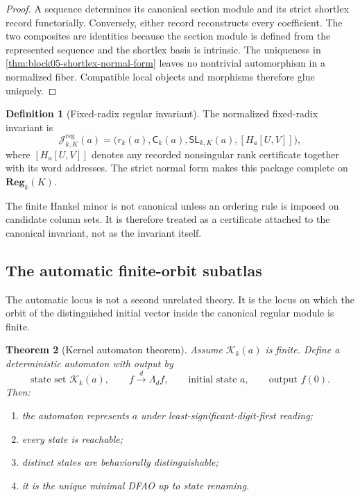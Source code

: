 \documentclass[11pt]{article}
\newtheorem{theorem}{Theorem}[section]
\theoremstyle{definition}
\newtheorem{definition}[theorem]{Definition}
\theoremstyle{remark}
\begin{document}
\begin{proof}
A sequence determines its canonical section module and its strict shortlex record functorially.  Conversely, either record reconstructs every coefficient.  The two composites are identities because the section module is defined from the represented sequence and the shortlex basis is intrinsic.  The uniqueness in \cref{thm:block05-shortlex-normal-form} leaves no nontrivial automorphism in a normalized fiber.  Compatible local objects and morphisms therefore glue uniquely.
\end{proof}

\begin{definition}[Fixed-radix regular invariant]
The normalized fixed-radix invariant is
\begin{equation}
\mathcal J_{k,K}^{\mathrm{reg}}(a)
=
\bigl(
 r_k(a),
 \mathsf C_k(a),
 \mathsf{SL}_{k,K}(a),
 [H_a[U,V]]
\bigr),
\label{eq:block05-regular-invariant}
\end{equation}
where \([H_a[U,V]]\) denotes any recorded nonsingular rank certificate together with its word addresses.  The strict normal form makes this package complete on \(\mathbf{Reg}_k(K)\).
\end{definition}

The finite Hankel minor is not canonical unless an ordering rule is imposed on candidate column sets.  It is therefore treated as a certificate attached to the canonical invariant, not as the invariant itself.

\subsection{The automatic finite-orbit subatlas}

The automatic locus is not a second unrelated theory.  It is the locus on which the orbit of the distinguished initial vector inside the canonical regular module is finite.

\begin{theorem}[Kernel automaton theorem]
\label{thm:block05-kernel-automaton}
Assume \(\mathcal K_k(a)\) is finite.  Define a deterministic automaton with output by
\[
\text{state set }\mathcal K_k(a),
\qquad
f\xrightarrow{d}\Lambda_df,
\qquad
\text{initial state }a,
\qquad
\text{output }f(0).
\]
Then:
\begin{enumerate}
\item the automaton represents \(a\) under least-significant-digit-first reading;
\item every state is reachable;
\item distinct states are behaviorally distinguishable;
\item it is the unique minimal DFAO up to state renaming.
\end{enumerate}
\end{theorem}
\end{document}
